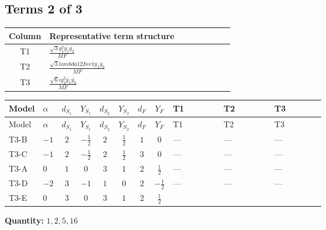 \documentclass[8pt]{article}
\begin{document}
\begin{landscape}
\subsection*{Terms 2 of 3}
\begin{center}
\begin{tabular}{@{}c >{\raggedright\arraybackslash}p{0.82\linewidth}@{}}
\toprule
Column & Representative term structure \\
\midrule
T1 & \(\displaystyle \frac{\sqrt{3} g_{1}^{2} \overline{y_{1}} \overline{y_{2}}}{MF}\) \\
\midrule
T2 & \(\displaystyle \frac{\sqrt{3} lambda12Inv1 \overline{y_{1}} \overline{y_{2}}}{MF}\) \\
\midrule
T3 & \(\displaystyle \frac{\sqrt{6} i g_{2}^{2} \overline{y_{1}} \overline{y_{2}}}{MF}\) \\
\midrule
\bottomrule
\end{tabular}
\end{center}
\smallskip
\tiny
\begin{longtable}{@{}llcccccc >{\raggedright\arraybackslash}p{0.21\linewidth} >{\raggedright\arraybackslash}p{0.21\linewidth} >{\raggedright\arraybackslash}p{0.21\linewidth}@{}}
\toprule
Model & $\alpha$ & $d_{S_1}$ & $Y_{S_1}$ & $d_{S_2}$ & $Y_{S_2}$ & $d_F$ & $Y_F$ & T1 & T2 & T3 \\
\midrule
\endfirsthead
\toprule
Model & $\alpha$ & $d_{S_1}$ & $Y_{S_1}$ & $d_{S_2}$ & $Y_{S_2}$ & $d_F$ & $Y_F$ & T1 & T2 & T3 \\
\midrule
\endhead
T3-B & $-1$ & $2$ & $-\frac{1}{2}$ & $2$ & $\frac{1}{2}$ & $1$ & $0$ & --- & --- & --- \\
\midrule
T3-C & $-1$ & $2$ & $-\frac{1}{2}$ & $2$ & $\frac{1}{2}$ & $3$ & $0$ & --- & --- & --- \\
\midrule
T3-A & $0$ & $1$ & $0$ & $3$ & $1$ & $2$ & $\frac{1}{2}$ & --- & --- & --- \\
\midrule
T3-D & $-2$ & $3$ & $-1$ & $1$ & $0$ & $2$ & $-\frac{1}{2}$ & --- & --- & --- \\
\midrule
T3-E & $0$ & $3$ & $0$ & $3$ & $1$ & $2$ & $\frac{1}{2}$ & \scriptsize\adjustbox{max width=\linewidth}{$\begin{gathered} - \frac{\sqrt{3} g_{1}^{2} \overline{y_{1}} \overline{y_{2}}}{8 MF}\end{gathered}$} & \scriptsize\adjustbox{max width=\linewidth}{$\begin{gathered} \frac{\sqrt{3} lambda12Inv1 \overline{y_{1}} \overline{y_{2}}}{6 MF}\end{gathered}$} & \scriptsize\adjustbox{max width=\linewidth}{$\begin{gathered} - \frac{\sqrt{6} i g_{2}^{2} \overline{y_{1}} \overline{y_{2}}}{6 MF}\end{gathered}$} \\
\midrule
\bottomrule
\end{longtable}
\clearpage
\noindent\textbf{Quantity: }$\mathrm{1,2,5,16}$\par\smallskip

\end{landscape}
\end{document}
